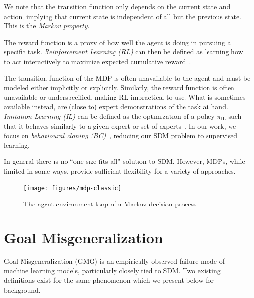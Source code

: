\documentclass[../main.tex]{subfiles}
\begin{document}
We note that the transition function only depends on the current state and action, implying that
current state is independent of all but the previous state. This is the \emph{Markov property}.

The reward function is a proxy of how well the agent is doing in pursuing a specific task.
\emph{Reinforcement Learning (RL)} can then be defined as learning how to act interactively to
maximize expected cumulative reward~\citep{sutton_reinforcement_2018}.

The transition function of the MDP is often unavailable to the agent and must be modeled either
implicitly or explicitly. Similarly, the reward function is often unavailable or underspecified,
making RL impractical to use. What is sometimes available instead, are (close to) expert
demonstrations of the task at hand. \emph{Imitation Learning (IL)} can be defined as the
optimization of a policy $\pi_{\text{IL}}$ such that it behaves similarly to a given expert or set
of experts~\citep{schaal_is_1999}. In our work, we focus on \emph{behavioural cloning
	(BC)}~\citep{michie_cognitive_1990}, reducing our SDM problem to supervised learning.

In general there is no ``one-size-fits-all'' solution to SDM. However, MDPs, while limited in some
ways, provide sufficient flexibility for a variety of approaches.

\begin{figure}[t]
	\centering
	\texttt{[image: figures/mdp-classic]}
	\caption[The agent-environment loop of a Markov decision process.]{The agent-environment loop of a Markov decision
		process.}
	\label{fig:mdp-classic}
\end{figure}


\section{Goal Misgeneralization}

Goal Misgeneralization (GMG) is an empirically observed failure mode of machine learning models,
particularly closely tied to SDM. Two existing definitions exist for the same phenomenon which we
present below for background.
\end{document}

